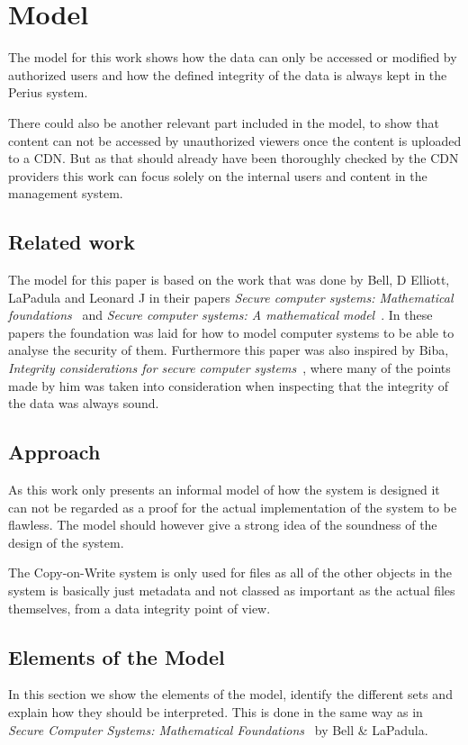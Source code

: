 \documentclass[a4paper,12pt]{article}
\begin{document}
\section{Model} \label{sec:model}
The model for this work shows how the data can only be accessed or modified by authorized
users and how the defined integrity of the data is always kept in the Perius system. 

There could also be another relevant part included in the model, to show that content can not be 
accessed by unauthorized viewers once the content is uploaded to a CDN. But as that should already 
have been thoroughly checked by the CDN providers this work can focus solely on the internal users 
and content in the management system. 

\subsection{Related work}
The model for this paper is based on the work that was done by Bell, D Elliott, LaPadula and 
Leonard J in their papers \textit{Secure computer systems: Mathematical foundations}~\cite{BLP1} 
and \textit{Secure computer systems: A mathematical model}~\cite{BLP2}. 
In these papers the foundation was laid for how to model computer systems to be able to analyse 
the security of them. Furthermore this paper was also inspired by Biba, \textit{Integrity 
considerations for secure computer systems}~\cite{BIBA}, where many of the points made by him was 
taken into consideration when inspecting that the integrity of the data was always sound.

\subsection{Approach}
As this work only presents an informal model of how the system is designed it can not be regarded as
a proof for the actual implementation of the system to be flawless. The model should however give a 
strong idea of the soundness of the design of the system.

The Copy-on-Write system is only used for files as all of the other objects in the system is
basically just metadata and not classed as important as the actual files themselves, from a data
integrity point of view.

\subsection{Elements of the Model}
In this section we show the elements of the model, identify the different sets and explain how they
should be interpreted. This is done in the same way as in \textit{Secure Computer Systems: Mathematical
Foundations}~\cite{BLP1} by Bell \& LaPadula.
\end{document}
